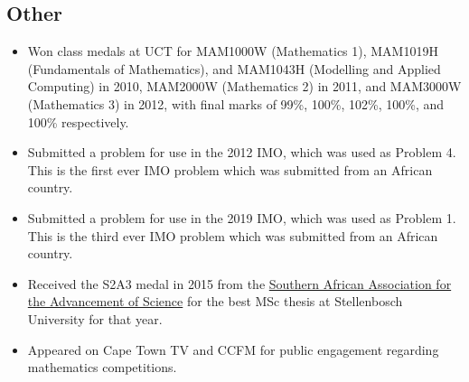 \documentclass{article}
\begin{document}
\subsection{Other}
\begin{itemize}
	\item Won class medals at UCT for MAM1000W (Mathematics 1), MAM1019H (Fundamentals of Mathematics), and MAM1043H (Modelling and Applied Computing) in 2010, MAM2000W (Mathematics 2) in 2011, and MAM3000W (Mathematics 3) in 2012, with final marks of 99\%, 100\%, 102\%, 100\%, and 100\% respectively.
	\item Submitted a problem for use in the 2012 IMO, which was used as Problem 4. This is the first ever IMO problem which was submitted from an African country.
	\item Submitted a problem for use in the 2019 IMO, which was used as Problem 1. This is the third ever IMO problem which was submitted from an African country.
	\item Received the S2A3 medal in 2015 from the \href{http://s2a3.org.za/joomla/index.php}{Southern African Association for the Advancement of Science} for the best MSc thesis at Stellenbosch University for that year.
	\item Appeared on Cape Town TV and CCFM for public engagement regarding mathematics competitions.
\end{itemize}


\end{document}
